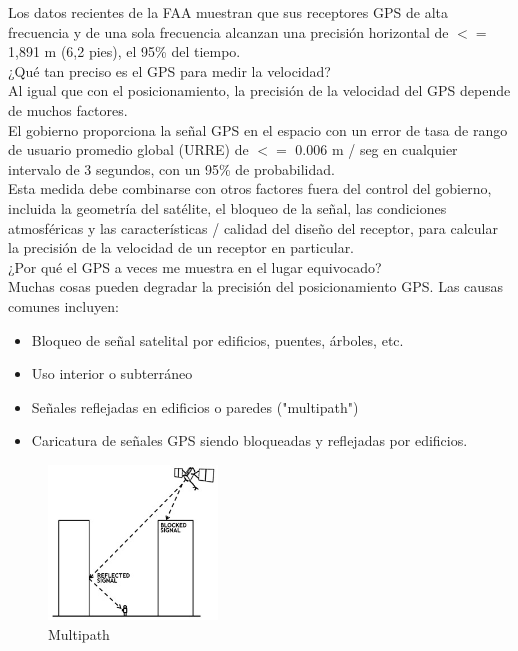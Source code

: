 Los datos recientes de la FAA muestran que sus receptores GPS de alta frecuencia y de una sola frecuencia alcanzan una precisión horizontal de $<=$ 1,891 m (6,2 pies), el 95\% del tiempo.\\

¿Qué tan preciso es el GPS para medir la velocidad?\\
Al igual que con el posicionamiento, la precisión de la velocidad del GPS depende de muchos factores.\\

El gobierno proporciona la señal GPS en el espacio con un error de tasa de rango de usuario promedio global (URRE) de $<=$ 0.006 m / seg en cualquier intervalo de 3 segundos, con un 95\% de probabilidad.\\

Esta medida debe combinarse con otros factores fuera del control del gobierno, incluida la geometría del satélite, el bloqueo de la señal, las condiciones atmosféricas y las características / calidad del diseño del receptor, para calcular la precisión de la velocidad de un receptor en particular.\\

¿Por qué el GPS a veces me muestra en el lugar equivocado?\\
Muchas cosas pueden degradar la precisión del posicionamiento GPS. Las causas comunes incluyen:
\begin{itemize}
	\item Bloqueo de señal satelital por edificios, puentes, árboles, etc.
	\item Uso interior o subterráneo
	\item Señales reflejadas en edificios o paredes ("multipath")
	\item Caricatura de señales GPS siendo bloqueadas y reflejadas por edificios.
\end{itemize}

\begin{figure}[htbp!]
	\begin{center}
		\includegraphics[width=0.4\textwidth]{MarcoTeorico/imagenes/GPS1}
		\caption{Multipath}
		\label{MT/SS/multipath}
	\end{center}
\end{figure}


